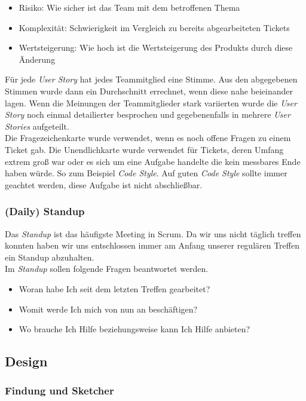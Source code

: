 \documentclass[11pt]{article}
\begin{document}
\begin{itemize}
\item Risiko: Wie sicher ist das Team mit dem betroffenen Thema
\item Komplexität: Schwierigkeit im Vergleich zu bereits abgearbeiteten Tickets
\item Wertsteigerung: Wie hoch ist die Wertsteigerung des Produkts durch diese Änderung
\end{itemize}

Für jede \textit{User Story} hat jedes Teammitglied eine Stimme. Aus den abgegebenen Stimmen wurde dann ein Durchschnitt errechnet, wenn diese nahe beieinander lagen. Wenn die Meinungen der Teammitglieder stark variierten wurde die \textit{User Story} noch einmal detailierter besprochen und gegebenenfalls in mehrere \textit{User Stories} aufgeteilt.\\
Die Fragezeichenkarte wurde verwendet, wenn es noch offene Fragen zu einem Ticket gab. Die Unendlichkarte wurde verwendet für Tickets, deren Umfang extrem groß war oder es sich um eine Aufgabe handelte die kein messbares Ende haben würde. So zum Beispiel \textit{Code Style}. Auf guten \textit{Code Style} sollte immer geachtet werden, diese Aufgabe ist nicht abschließbar.

\subsubsection{(Daily) Standup}
Das \textit{Standup} ist das häufigste Meeting in Scrum. Da wir uns nicht täglich treffen konnten haben wir uns entschlossen immer am Anfang unserer regulären Treffen ein Standup abzuhalten.\\
Im \textit{Standup} sollen folgende Fragen beantwortet werden.
\begin{itemize}
\item Woran habe Ich seit dem letzten Treffen gearbeitet?
\item Womit werde Ich mich von nun an beschäftigen?
\item Wo brauche Ich Hilfe beziehungsweise kann Ich Hilfe anbieten?
\end{itemize}
\subsection{Design}
\subsubsection{Findung und Sketcher}
\end{document}
